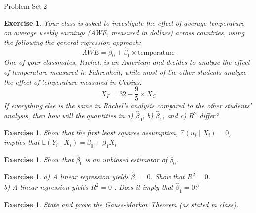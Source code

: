 \documentclass{article}
\newtheorem{exercise}[theorem]{Exercise}
\begin{document}
\begin{center} 
{\Large Problem Set 2}
\end{center}


\begin{exercise} %
    Your class is asked to investigate the effect of average temperature on average weekly earnings (AWE, measured in dollars) across countries, using the following the general regression approach:
    \begin{equation*}
        \hat{AWE} = \hat{\beta}_0 +  \hat{\beta}_1 \times \text{temperature}
    \end{equation*}
    One of your classmates, Rachel, is an American and decides to analyze the effect of temperature measured in Fahrenheit, while most of the other students analyze the effect of temperature measured in Celsius.
    \begin{equation*}
        X_F= 32+\frac{9}{5}\times X_C
    \end{equation*}
    If everything else is the same in Rachel’s analysis compared to the other students’ analysis, then how will the quantities in a) $\hat{\beta}_0$, b) $\hat{\beta}_1$, and c) $R^2$ differ?
\end{exercise}


\begin{exercise} %
    Show that the first least squares assumption, $\mathbb{E}(u_i\mid X_i)=0$, implies that $\mathbb{E}(Y_i\mid X_i) = \beta_0 + \beta_1 X_i$
\end{exercise}


\begin{exercise} %
    Show that $\hat{\beta}_0$ is an unbiased estimator of $\beta_0$.
\end{exercise}


\begin{exercise} %
    a) A linear regression yields $\hat{\beta}_1 = 0$. Show that $R^2 = 0$.\\
    b) A linear regression yields $R^2 = 0$ . Does it imply that $\hat{\beta}_1 = 0$?
    
\end{exercise}


\begin{exercise}%
    State and prove the Gauss-Markov Theorem (as stated in class). 
\end{exercise}
\end{document}

